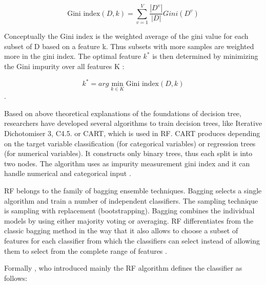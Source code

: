 \documentclass[12pt, a4paper, titlepage]{article}
\begin{document}
\[\text{Gini index}(D,k) = \sum_{v=1}^V \frac{|D^v|}{|D|} Gini(D^v) \]

Conceptually the Gini index is the weighted average of the gini value for each subset of D based on a feature k. Thus subsets with more samples are weighted more in the gini index. The optimal feature $k^*$ is then determined by minimizing the Gini impurity over all features K \citep[3156]{yuan2021}: 

\[ k^* = arg \min_{k \in K} \text{Gini index} (D,k) \]. 

Based on above theoretical explanations of the foundations of decision tree, researchers have developed several algorithms to train decision trees, like Iterative Dichotomiser 3, C4.5. or \ac{CART}, which is used in \ac{RF}. \ac{CART} produces depending on the target variable classification (for categorical variables) or regression trees (for numerical variables). It constructs only binary trees, thus each split is into two nodes. The algorithm uses as impurity measurement gini index and it can handle numerical and categorical input \citep{brijain2014}.

\ac{RF} belongs to the family of bagging ensemble techniques.
Bagging selects a single algorithm and train a number of independent classifiers. The sampling technique is sampling with replacement (bootstrapping). Bagging combines the individual models by using either majority voting or averaging. \ac{RF} differentiates from the classic bagging method in the way that it also allows to choose a subset of features for each classifier from which the classifiers can select instead of  allowing them to select from the complete range of features \citep{polikar2012, zhou2009, Berthold2020}. 

Formally \citet{breiman2001}, who introduced mainly the \ac{RF} algorithm defines the classifier as follows:
\end{document}
